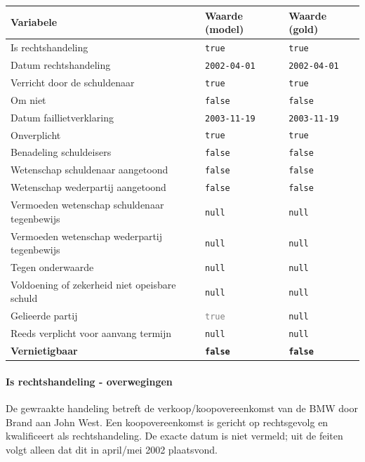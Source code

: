 \documentclass[
  dutch,
  a4paper,
]{article}
\begin{document}
\begin{center}
\small
\begin{tabular}{@{}p{7.4cm}p{2.6cm}p{2.6cm}@{}}
\toprule
Variabele & Waarde (model) & Waarde (gold) \\
\midrule
Is rechtshandeling & \texttt{true} & \texttt{true} \\
Datum rechtshandeling & \texttt{2002-04-01} & \texttt{2002-04-01} \\
Verricht door de schuldenaar & \texttt{true} & \texttt{true} \\
Om niet & \texttt{false} & \texttt{false} \\
Datum faillietverklaring & \texttt{2003-11-19} & \texttt{2003-11-19} \\
Onverplicht & \texttt{true} & \texttt{true} \\
Benadeling schuldeisers & \texttt{false} & \texttt{false} \\
Wetenschap schuldenaar aangetoond & \texttt{false} & \texttt{false} \\
Wetenschap wederpartij aangetoond & \texttt{false} & \texttt{false} \\
Vermoeden wetenschap schuldenaar tegenbewijs & \texttt{null} & \texttt{null} \\
Vermoeden wetenschap wederpartij tegenbewijs & \texttt{null} & \texttt{null} \\
Tegen onderwaarde & \texttt{null} & \texttt{null} \\
Voldoening of zekerheid niet opeisbare schuld & \texttt{null} & \texttt{null} \\
Gelieerde partij & \textcolor{gray}{\texttt{true}} & \texttt{null} \\
Reeds verplicht voor aanvang termijn & \texttt{null} & \texttt{null} \\
\textbf{Vernietigbaar} & \textbf{\texttt{false}} & \textbf{\texttt{false}} \\
\bottomrule
\end{tabular}
\end{center}

\paragraph{Is rechtshandeling - overwegingen}\label{is-rechtshandeling---overwegingen-61}

De gewraakte handeling betreft de verkoop/koopovereenkomst van de BMW door Brand aan John West. Een koopovereenkomst is gericht op rechtsgevolg en kwalificeert als rechtshandeling. De exacte datum is niet vermeld; uit de feiten volgt alleen dat dit in april/mei 2002 plaatsvond.
\end{document}
